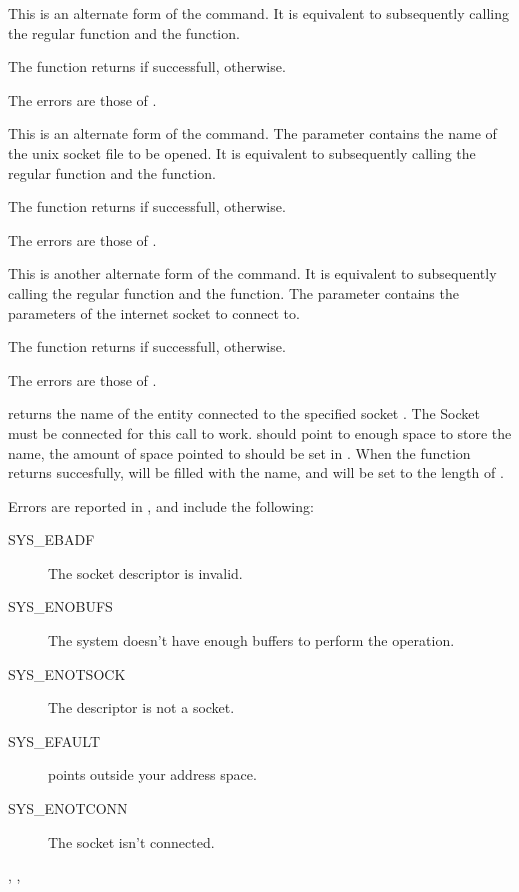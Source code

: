 { This is an alternate form of the  command. 
It is equivalent
to subsequently calling the regular  function and the 
 function.

The function returns  if successfull,  otherwise.
}{The errors are those of .}
{}

{ This is an alternate form of the  command. The parameter
 contains the name of the unix socket file to be opened. 
It is equivalent to subsequently calling the regular  
function and the   function.

The function returns  if successfull,  otherwise.
}{The errors are those of .}
{}


{ This is another alternate form of the  command. 
It is equivalent
to subsequently calling the regular  function and the 
 function. The  parameter contains the parameters
of the internet socket to connect to.

The function returns  if successfull,  otherwise.
}{The errors are those of .}
{}

\html{}

{ returns the name of the entity connected to the 
specified socket . The Socket must be connected for this call to
work. 
 should point to enough space to store the name, the
amount of space pointed to should be set in . 
When the function returns succesfully,  will be filled with the 
name, and  will be set to the length of .
}
{Errors are reported in , and include the following:
\begin{description}
\item[SYS\_EBADF] The socket descriptor is invalid.
\item[SYS\_ENOBUFS] The system doesn't have enough buffers to perform the
operation.
\item[SYS\_ENOTSOCK] The descriptor is not a socket.
\item[SYS\_EFAULT]  points outside your address space.
\item[SYS\_ENOTCONN] The socket isn't connected.
\end{description}
}{, , }


